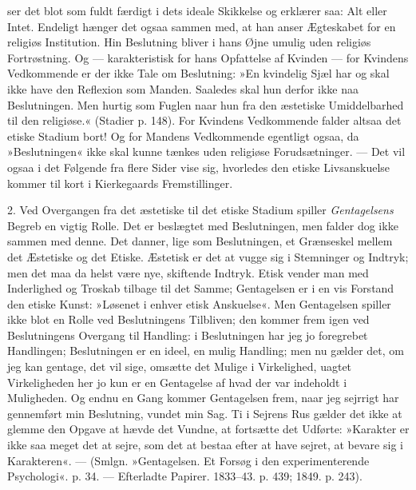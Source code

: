 \documentclass[12pt,a4paper,openany]{book}
\newcommand{\opage}[1]{\marginnote{\footnotesize\textit{[#1]}}}
\begin{document}
ser det blot som fuldt færdigt i dets ideale Skikkelse og
erklærer saa: Alt eller Intet. Endeligt hænger det ogsaa
sammen med, at han anser Ægteskabet for en religiøs
Institution. Hin Beslutning bliver i hans Øjne umulig
uden religiøs Fortrøstning. Og --- karakteristisk for hans
Opfattelse af Kvinden --- for Kvindens Vedkommende er
der ikke Tale om Beslutning: »En kvindelig Sjæl har og
skal ikke have den Reflexion som Manden. Saaledes
skal hun derfor ikke naa Beslutningen. Men hurtig som
Fuglen naar hun fra den æstetiske Umiddelbarhed til den
religiøse.« (Stadier p. 148). For Kvindens Vedkommende
falder altsaa det etiske Stadium bort! Og for Mandens
Vedkommende egentligt ogsaa, da »Beslutningen« ikke
skal kunne tænkes uden religiøse Forudsætninger. --- Det
vil ogsaa i det Følgende fra flere Sider vise sig, hvorledes
den etiske Livsanskuelse kommer til kort i Kierkegaards
Fremstillinger.

2. Ved Overgangen fra det æstetiske til det etiske
Stadium spiller \textit{Gentagelsens} Begreb en vigtig Rolle.
Det er beslægtet med Beslutningen, men falder dog ikke
\opage{95}sammen med denne. Det danner, lige som Beslutningen,
et Grænseskel mellem det Æstetiske og det Etiske.
Æstetisk er det at vugge sig i Stemninger og Indtryk;
men det maa da helst være nye, skiftende Indtryk.
Etisk vender man med Inderlighed og Troskab tilbage
til det Samme; Gentagelsen er i en vis Forstand den
etiske Kunst: »Løsenet i enhver etisk Anskuelse«. Men
Gentagelsen spiller ikke blot en Rolle ved Beslutningens
Tilbliven; den kommer frem igen ved Beslutningens Overgang
til Handling: i Beslutningen har jeg jo foregrebet
Handlingen; Beslutningen er en ideel, en mulig Handling;
men nu gælder det, om jeg kan gentage, det vil
sige, omsætte det Mulige i Virkelighed, uagtet Virkeligheden
her jo kun er en Gentagelse af hvad der var indeholdt
i Muligheden. Og endnu en Gang kommer Gentagelsen
frem, naar jeg sejrrigt har gennemført min Beslutning,
vundet min Sag. Ti i Sejrens Rus gælder det ikke at
glemme den Opgave at hævde det Vundne, at fortsætte
det Udførte: »Karakter er ikke saa meget det at sejre,
som det at bestaa efter at have sejret, at bevare sig i
Karakteren«. --- (Smlgn. »Gentagelsen. Et Forsøg i den
experimenterende Psychologi«. p. 34. --- Efterladte Papirer.
1833--43. p. 439; 1849. p. 243).
\end{document}
